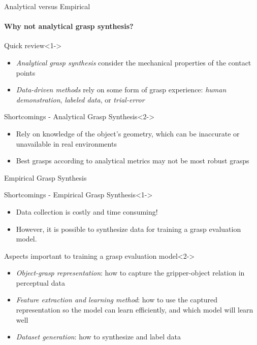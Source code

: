 \documentclass{beamer}
\begin{document}
\begin{frame}{Analytical versus Empirical}
    \framesubtitle{Why not analytical grasp synthesis?}
    \begin{exampleblock}{Quick review}<1->
        \begin{itemize}
            \item \emph{Analytical grasp synthesis} consider the mechanical properties of the contact
                points \cite{Roa2015, Sahbani2012}
            \item \emph{Data-driven methods} rely on some form of grasp experience: \textit{human demonstration},
                        \textit{labeled data}, or \textit{trial-error} \cite{Bohg2014}
        \end{itemize}
    \end{exampleblock}

    \begin{exampleblock}{Shortcomings - Analytical Grasp Synthesis}<2->
        \begin{itemize}
            \item Rely on knowledge of the object's geometry, which can be inaccurate or unavailable in real
                  environments
            \item Best grasps according to analytical metrics may not be most robust grasps \cite{WeiszAllen2012}
        \end{itemize}
    \end{exampleblock}
\end{frame}

\begin{frame}{Empirical Grasp Synthesis}
    \begin{exampleblock}{Shortcomings - Empirical Grasp Synthesis}<1->
        \begin{itemize}
            \item Data collection is costly and time consuming!
            \item However, it is possible to synthesize data for training a grasp evaluation model.
        \end{itemize}
    \end{exampleblock}

    \begin{exampleblock}{Aspects important to training a grasp evaluation model}<2->
        \begin{itemize}
            \item \emph{Object-grasp representation}: how to capture the gripper-object relation in perceptual data
            \item \emph{Feature extraction and learning method}: how to use the captured representation so the model
                can learn efficiently, and which model will learn well
            \item \emph{Dataset generation}: how to synthesize and label data
        \end{itemize}
    \end{exampleblock}
\end{frame}
\end{document}

